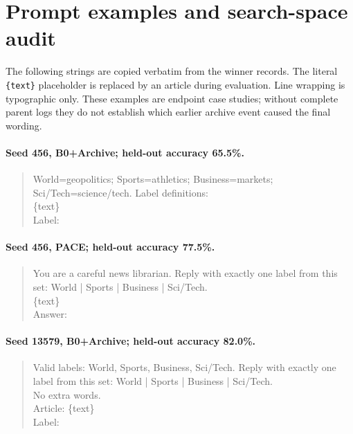 \section{Prompt examples and search-space audit}
\label{app:prompts}
The following strings are copied verbatim from the winner records. The literal
\texttt{\{text\}} placeholder is replaced by an article during evaluation.
Line wrapping is typographic only. These examples are endpoint case studies;
without complete parent logs they do not establish which earlier archive event
caused the final wording.

\paragraph{Seed 456, B0+Archive; held-out accuracy 65.5\%.}

\begin{quote}\small\ttfamily\raggedright
World=geopolitics; Sports=athletics; Business=markets; Sci/Tech=science/tech. Label definitions:\\
\{text\}\\
Label:
\end{quote}

\paragraph{Seed 456, PACE; held-out accuracy 77.5\%.}

\begin{quote}\small\ttfamily\raggedright
You are a careful news librarian. Reply with exactly one label from this set: World | Sports | Business | Sci/Tech.\\
\{text\}\\
Answer:
\end{quote}

\paragraph{Seed 13579, B0+Archive; held-out accuracy 82.0\%.}

\begin{quote}\small\ttfamily\raggedright
Valid labels: World, Sports, Business, Sci/Tech. Reply with exactly one label from this set: World | Sports | Business | Sci/Tech.\\
No extra words.\\
Article: \{text\}\\
Label:
\end{quote}

